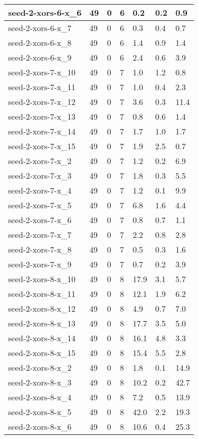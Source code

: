 \begin{scriptsize}
\begin{longtable}{|p{5cm}|l|l|l|l|l|l|}
seed-2-xors-6-x\_6&49&0&6&0.2&0.2&0.9 \\ \hline 
seed-2-xors-6-x\_7&49&0&6&0.3&0.4&0.7 \\ \hline 
seed-2-xors-6-x\_8&49&0&6&1.4&0.9&1.4 \\ \hline 
seed-2-xors-6-x\_9&49&0&6&2.4&0.6&3.9 \\ \hline 
seed-2-xors-7-x\_10&49&0&7&1.0&1.2&0.8 \\ \hline 
seed-2-xors-7-x\_11&49&0&7&1.0&0.4&2.3 \\ \hline 
seed-2-xors-7-x\_12&49&0&7&3.6&0.3&11.4 \\ \hline 
seed-2-xors-7-x\_13&49&0&7&0.8&0.6&1.4 \\ \hline 
seed-2-xors-7-x\_14&49&0&7&1.7&1.0&1.7 \\ \hline 
seed-2-xors-7-x\_15&49&0&7&1.9&2.5&0.7 \\ \hline 
seed-2-xors-7-x\_2&49&0&7&1.2&0.2&6.9 \\ \hline 
seed-2-xors-7-x\_3&49&0&7&1.8&0.3&5.5 \\ \hline 
seed-2-xors-7-x\_4&49&0&7&1.2&0.1&9.9 \\ \hline 
seed-2-xors-7-x\_5&49&0&7&6.8&1.6&4.4 \\ \hline 
seed-2-xors-7-x\_6&49&0&7&0.8&0.7&1.1 \\ \hline 
seed-2-xors-7-x\_7&49&0&7&2.2&0.8&2.8 \\ \hline 
seed-2-xors-7-x\_8&49&0&7&0.5&0.3&1.6 \\ \hline 
seed-2-xors-7-x\_9&49&0&7&0.7&0.2&3.9 \\ \hline 
seed-2-xors-8-x\_10&49&0&8&17.9&3.1&5.7 \\ \hline 
seed-2-xors-8-x\_11&49&0&8&12.1&1.9&6.2 \\ \hline 
seed-2-xors-8-x\_12&49&0&8&4.9&0.7&7.0 \\ \hline 
seed-2-xors-8-x\_13&49&0&8&17.7&3.5&5.0 \\ \hline 
seed-2-xors-8-x\_14&49&0&8&16.1&4.8&3.3 \\ \hline 
seed-2-xors-8-x\_15&49&0&8&15.4&5.5&2.8 \\ \hline 
seed-2-xors-8-x\_2&49&0&8&1.8&0.1&14.9 \\ \hline 
seed-2-xors-8-x\_3&49&0&8&10.2&0.2&42.7 \\ \hline 
seed-2-xors-8-x\_4&49&0&8&7.2&0.5&13.9 \\ \hline 
seed-2-xors-8-x\_5&49&0&8&42.0&2.2&19.3 \\ \hline 
seed-2-xors-8-x\_6&49&0&8&10.6&0.4&25.3 \\ \hline 

\end{longtable}
\end{scriptsize}
